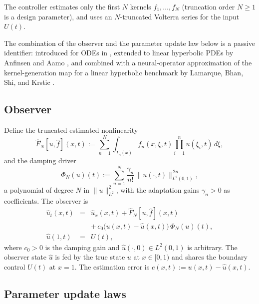 \documentclass[journal,twoside,web]{ieeecolor}
\begin{document}
The controller estimates only the first $N$ kernels $f_1,\ldots,f_N$ (truncation order $N\ge 1$ is a design parameter), and uses an $N$-truncated Volterra series for the input $U(t)$.

The combination of the observer and the parameter update law below is a passive identifier: introduced for ODEs in \cite{KK94}, extended to linear hyperbolic PDEs by Anfinsen and Aamo \cite[\S4]{AA19}, and combined with a neural-operator approximation of the kernel-generation map for a linear hyperbolic benchmark by Lamarque, Bhan, Shi, and Krstic \cite[\S7]{LBSK}.

\subsection{Observer}\label{sec:observer}

Define the truncated estimated nonlinearity
\begin{equation}\label{eq:Fhat-N}
\hat F_N[u,\hat f](x,t):=\sum_{n=1}^N\int_{T_n(x)}\hat f_n(x,\xi,t)\prod_{i=1}^n u(\xi_i,t)\,d\xi,
\end{equation}
and the damping driver
\begin{equation}\label{eq:Phi-N}
\Phi_N(u)(t):=\sum_{n=1}^N\frac{\gamma_n}{n!}\,\|u(\cdot,t)\|_{L^2(0,1)}^{\,2n},
\end{equation}
a polynomial of degree $N$ in $\|u\|_{L^2}^2$, with the adaptation gains $\gamma_n>0$ as coefficients. The observer is
\begin{eqnarray}
\hat u_t(x,t) &=& \hat u_x(x,t) + \hat F_N[u,\hat f](x,t) \nonumber\\
&& +\, c_0\bigl(u(x,t)-\hat u(x,t)\bigr)\,\Phi_N(u)(t), \label{eq:obs1-N}\\
\hat u(1,t) &=& U(t), \label{eq:obs2-N}
\end{eqnarray}
where $c_0>0$ is the damping gain and $\hat u(\cdot,0)\in L^2(0,1)$ is arbitrary.
The observer state $\hat u$ is fed by the true state $u$ at $x\in[0,1)$ and shares the boundary control $U(t)$ at $x=1$. The estimation error is $e(x,t):=u(x,t)-\hat u(x,t)$.

\subsection{Parameter update laws}\label{sec:updates}
\end{document}
